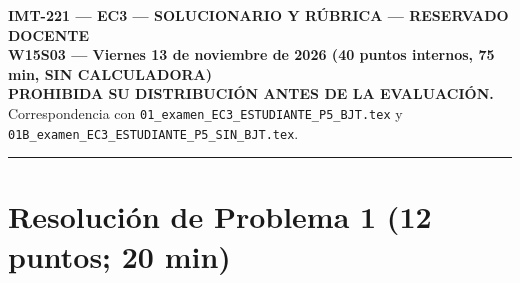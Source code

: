 \documentclass[11pt, a4paper]{article}
\begin{document}
\noindent
{\LARGE \textbf{\textcolor{warnred}{IMT-221 — EC3 — SOLUCIONARIO Y RÚBRICA — RESERVADO DOCENTE}}}\\[0.12cm]
{\Large \textbf{W15S03 — Viernes 13 de noviembre de 2026 (40 puntos internos, 75 min, SIN CALCULADORA)}}\\[0.08cm]
{\small \textbf{PROHIBIDA SU DISTRIBUCIÓN ANTES DE LA EVALUACIÓN.} Correspondencia con \texttt{01\_examen\_EC3\_ESTUDIANTE\_P5\_BJT.tex} y \texttt{01B\_examen\_EC3\_ESTUDIANTE\_P5\_SIN\_BJT.tex}.}
\par\vspace{0.15cm}\noindent\rule{\linewidth}{0.6pt}\vspace{0.2cm}

\section*{Resolución de Problema 1 (12 puntos; 20 min)}
\end{document}
